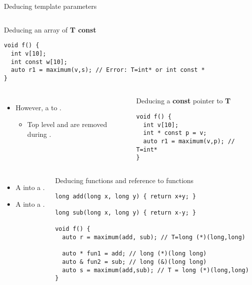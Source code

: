 \begin{frame}{Deducing template parameters}
\begin{columns}
\begin{block}{Deducing an array of \textbf{T const}}
\begin{lstlisting}
void f() {
  int v[10];
  int const w[10];
  auto r1 = maximum(v,s); // Error: T=int* or int const *
}
\end{lstlisting}
\end{block}
\end{columns}


\begin{columns}
\begin{itemize}
  \item However, a   to .
    \begin{itemize}
      \item Top level  and  are removed during .
    \end{itemize}
\end{itemize}

\begin{block}{Deducing a \textbf{const} pointer to \textbf{T}}
\begin{lstlisting}
void f() {
  int v[10];
  int * const p = v;
  auto r1 = maximum(v,p); // T=int*
}
\end{lstlisting}
\end{block}
\end{columns}

\framebreak

\begin{columns}

\begin{itemize}
  \item A   into a .


  \item A   into a . 
\end{itemize}

\begin{block}{Deducing functions and reference to functions}
\begin{lstlisting}
long add(long x, long y) { return x+y; }

long sub(long x, long y) { return x-y; }

void f() {
  auto r = maximum(add, sub); // T=long (*)(long,long)

  auto * fun1 = add; // long (*)(long long)
  auto & fun2 = sub; // long (&)(long long)
  auto s = maximum(add,sub); // T = long (*)(long,long)
}
\end{lstlisting}
\end{block}
\end{columns}

\end{frame}
